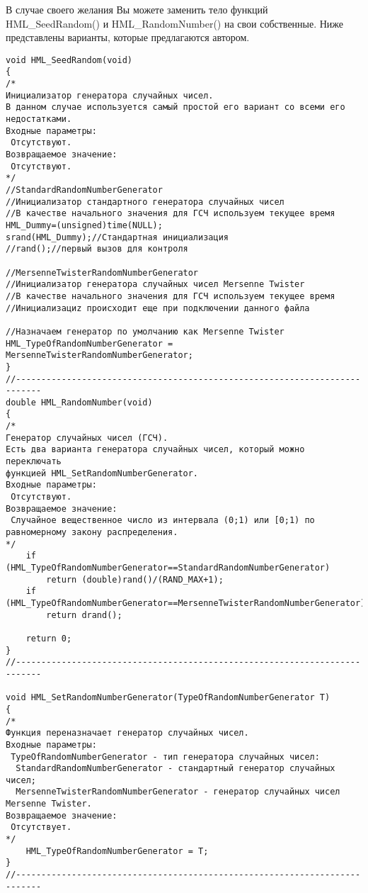 В случае своего желания Вы можете заменить тело функций HML\_SeedRandom() и HML\_RandomNumber() на свои собственные. Ниже представлены варианты, которые предлагаются автором.

\begin{lstlisting}[label=random_standard,caption=Стандартный вариант по умолчанию]
void HML_SeedRandom(void)
{
/*
Инициализатор генератора случайных чисел.
В данном случае используется самый простой его вариант со всеми его недостатками.
Входные параметры:
 Отсутствуют.
Возвращаемое значение:
 Отсутствуют.
*/
//StandardRandomNumberGenerator
//Инициализатор стандартного генератора случайных чисел
//В качестве начального значения для ГСЧ используем текущее время
HML_Dummy=(unsigned)time(NULL);
srand(HML_Dummy);//Стандартная инициализация
//rand();//первый вызов для контроля

//MersenneTwisterRandomNumberGenerator
//Инициализатор генератора случайных чисел Mersenne Twister
//В качестве начального значения для ГСЧ используем текущее время
//Инициализациz происходит еще при подключении данного файла

//Назначаем генератор по умолчанию как Mersenne Twister
HML_TypeOfRandomNumberGenerator = MersenneTwisterRandomNumberGenerator;
}
//---------------------------------------------------------------------------
double HML_RandomNumber(void)
{
/*
Генератор случайных чисел (ГСЧ).
Есть два варианта генератора случайных чисел, который можно переключать
функцией HML_SetRandomNumberGenerator.
Входные параметры:
 Отсутствуют.
Возвращаемое значение:
 Случайное вещественное число из интервала (0;1) или [0;1) по равномерному закону распределения.
*/
    if (HML_TypeOfRandomNumberGenerator==StandardRandomNumberGenerator)
        return (double)rand()/(RAND_MAX+1);
    if (HML_TypeOfRandomNumberGenerator==MersenneTwisterRandomNumberGenerator)
        return drand();

    return 0;
}
//---------------------------------------------------------------------------

void HML_SetRandomNumberGenerator(TypeOfRandomNumberGenerator T)
{
/*
Функция переназначает генератор случайных чисел.
Входные параметры:
 TypeOfRandomNumberGenerator - тип генератора случайных чисел:
  StandardRandomNumberGenerator - стандартный генератор случайных чисел;
  MersenneTwisterRandomNumberGenerator - генератор случайных чисел Mersenne Twister.
Возвращаемое значение:
 Отсутствует.
*/
    HML_TypeOfRandomNumberGenerator = T;
}
//---------------------------------------------------------------------------
\end{lstlisting}

